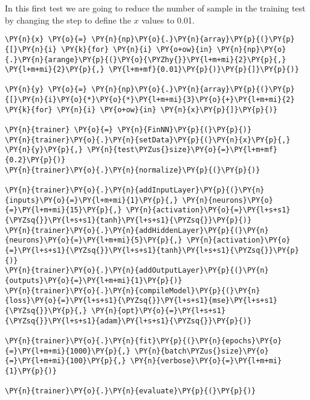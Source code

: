 \begin{Answer}
In this first test we are going to reduce the number of sample in the training test by changing the step to define the $x$ values to 0.01.

\begin{codebox}[size=fbox, boxrule=1pt, colback=cellbackground, colframe=cellborder]
\begin{Verbatim}[commandchars=\\\{\}]
\PY{n}{x} \PY{o}{=} \PY{n}{np}\PY{o}{.}\PY{n}{array}\PY{p}{(}\PY{p}{[}\PY{n}{i} \PY{k}{for} \PY{n}{i} \PY{o+ow}{in} \PY{n}{np}\PY{o}{.}\PY{n}{arange}\PY{p}{(}\PY{o}{\PYZhy{}}\PY{l+m+mi}{2}\PY{p}{,} \PY{l+m+mi}{2}\PY{p}{,} \PY{l+m+mf}{0.01}\PY{p}{)}\PY{p}{]}\PY{p}{)}
	
\PY{n}{y} \PY{o}{=} \PY{n}{np}\PY{o}{.}\PY{n}{array}\PY{p}{(}\PY{p}{[}\PY{n}{i}\PY{o}{*}\PY{o}{*}\PY{l+m+mi}{3}\PY{o}{+}\PY{l+m+mi}{2} \PY{k}{for} \PY{n}{i} \PY{o+ow}{in} \PY{n}{x}\PY{p}{]}\PY{p}{)}
	
\PY{n}{trainer} \PY{o}{=} \PY{n}{FinNN}\PY{p}{(}\PY{p}{)}
\PY{n}{trainer}\PY{o}{.}\PY{n}{setData}\PY{p}{(}\PY{n}{x}\PY{p}{,} \PY{n}{y}\PY{p}{,} \PY{n}{test\PYZus{}size}\PY{o}{=}\PY{l+m+mf}{0.2}\PY{p}{)}
\PY{n}{trainer}\PY{o}{.}\PY{n}{normalize}\PY{p}{(}\PY{p}{)}
	
\PY{n}{trainer}\PY{o}{.}\PY{n}{addInputLayer}\PY{p}{(}\PY{n}{inputs}\PY{o}{=}\PY{l+m+mi}{1}\PY{p}{,} \PY{n}{neurons}\PY{o}{=}\PY{l+m+mi}{15}\PY{p}{,} \PY{n}{activation}\PY{o}{=}\PY{l+s+s1}{\PYZsq{}}\PY{l+s+s1}{tanh}\PY{l+s+s1}{\PYZsq{}}\PY{p}{)}
\PY{n}{trainer}\PY{o}{.}\PY{n}{addHiddenLayer}\PY{p}{(}\PY{n}{neurons}\PY{o}{=}\PY{l+m+mi}{5}\PY{p}{,} \PY{n}{activation}\PY{o}{=}\PY{l+s+s1}{\PYZsq{}}\PY{l+s+s1}{tanh}\PY{l+s+s1}{\PYZsq{}}\PY{p}{)}
\PY{n}{trainer}\PY{o}{.}\PY{n}{addOutputLayer}\PY{p}{(}\PY{n}{outputs}\PY{o}{=}\PY{l+m+mi}{1}\PY{p}{)}
\PY{n}{trainer}\PY{o}{.}\PY{n}{compileModel}\PY{p}{(}\PY{n}{loss}\PY{o}{=}\PY{l+s+s1}{\PYZsq{}}\PY{l+s+s1}{mse}\PY{l+s+s1}{\PYZsq{}}\PY{p}{,} \PY{n}{opt}\PY{o}{=}\PY{l+s+s1}{\PYZsq{}}\PY{l+s+s1}{adam}\PY{l+s+s1}{\PYZsq{}}\PY{p}{)}
	
\PY{n}{trainer}\PY{o}{.}\PY{n}{fit}\PY{p}{(}\PY{n}{epochs}\PY{o}{=}\PY{l+m+mi}{1000}\PY{p}{,} \PY{n}{batch\PYZus{}size}\PY{o}{=}\PY{l+m+mi}{100}\PY{p}{,} \PY{n}{verbose}\PY{o}{=}\PY{l+m+mi}{1}\PY{p}{)}
	
\PY{n}{trainer}\PY{o}{.}\PY{n}{evaluate}\PY{p}{(}\PY{p}{)}
\end{Verbatim}
\end{codebox}


\end{Answer}
